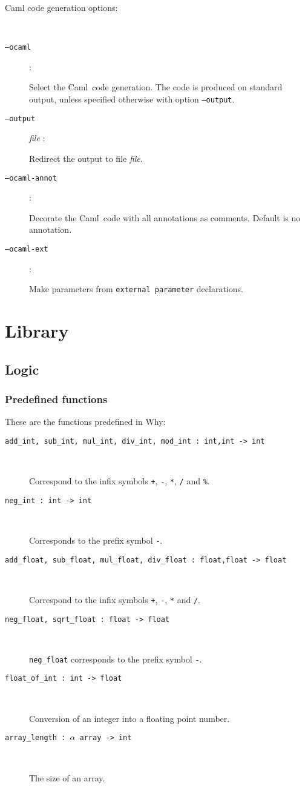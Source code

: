 \documentclass[a4paper,12pt]{report}
\newcommand{\caml}{\textsf{Caml}}
\newcommand{\why}{\textsf{Why}}
\begin{document}
\begin{description}
  \item[Caml code generation options:] ~\par
  \item[\texttt{--ocaml}]: ~\par 
    Select the \caml\ code generation. The code is produced on
    standard output, unless specified otherwise with option \texttt{--output}.
  \item[\texttt{--output}] \textit{file} : ~\par 
    Redirect the output to file \textit{file}.
  \item[\texttt{--ocaml-annot}]: ~\par 
    Decorate the \caml\ code with all annotations as comments. Default
    is no annotation.
  \item[\texttt{--ocaml-ext}]: ~\par 
    Make parameters from \texttt{external parameter} declarations.
    
\end{description}


\section{Library}
\label{library}

\subsection{Logic}
\label{lib:logic}

\subsubsection{Predefined functions}

These are the functions predefined in \why:
\begin{description}
\item[\texttt{add\_int, sub\_int, mul\_int, div\_int, mod\_int :
    int,int -> int}] ~\par
  Correspond to the infix symbols
  \texttt{+}, \texttt{-}, \texttt{*}, \texttt{/} and \texttt{\%}.
\item[\texttt{neg\_int : int -> int}] ~\par
  Corresponds to the prefix symbol \texttt{-}.
\item[\texttt{add\_float, sub\_float, mul\_float, div\_float :
    float,float -> float}] ~\par
  Correspond to the infix symbols
  \texttt{+}, \texttt{-}, \texttt{*} and \texttt{/}.
\item[\texttt{neg\_float, sqrt\_float : float -> float}] ~\par
  \texttt{neg\_float} corresponds to the prefix symbol \texttt{-}.
\item[\texttt{float\_of\_int : int -> float}] ~\par
  Conversion of an integer into a floating point number.
\item[\texttt{array\_length : $\alpha$ array -> int}] ~\par
  The size of an array.
\end{description}
\end{document}
